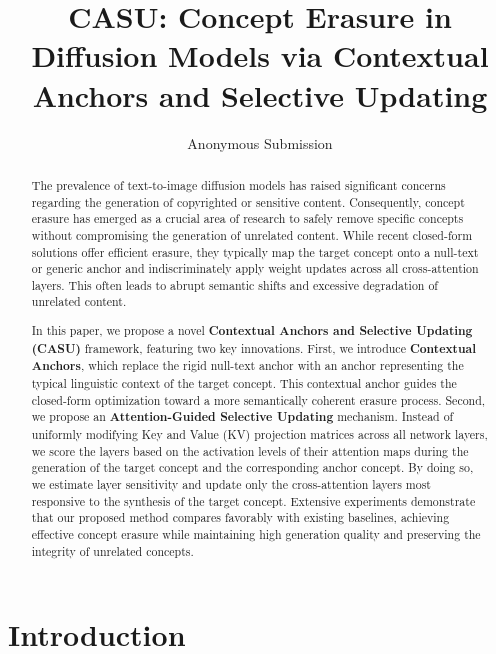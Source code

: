 \documentclass[letterpaper]{article} %
\title{CASU: Concept Erasure in Diffusion Models via Contextual Anchors and Selective Updating}
\author{Anonymous Submission}
\begin{document}
\maketitle

\begin{abstract}
The prevalence of text-to-image diffusion models has raised significant concerns regarding the generation of copyrighted or sensitive content. Consequently, concept erasure has emerged as a crucial area of research to safely remove specific concepts without compromising the generation of unrelated content. While recent closed-form solutions offer efficient erasure, they typically map the target concept onto a null-text or generic anchor and indiscriminately apply weight updates across all cross-attention layers. This often leads to abrupt semantic shifts and excessive degradation of unrelated content.

In this paper, we propose a novel \textbf{Contextual Anchors and Selective Updating (CASU)} framework, featuring two key innovations. First, we introduce \textbf{Contextual Anchors}, which replace the rigid null-text anchor with an anchor representing the typical linguistic context of the target concept. This contextual anchor guides the closed-form optimization toward a more semantically coherent erasure process. Second, we propose an \textbf{Attention-Guided Selective Updating} mechanism. Instead of uniformly modifying Key and Value (KV) projection matrices across all network layers, we score the layers based on the activation levels of their attention maps during the generation of the target concept and the corresponding anchor concept. By doing so, we estimate layer sensitivity and update only the cross-attention layers most responsive to the synthesis of the target concept. Extensive experiments demonstrate that our proposed method compares favorably with existing baselines, achieving effective concept erasure while maintaining high generation quality and preserving the integrity of unrelated concepts.
\end{abstract}



\section{Introduction}
\end{document}
